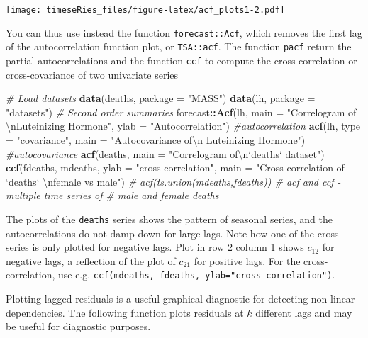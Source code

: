 \documentclass[]{book}
\newenvironment{Shaded}{\begin{snugshade}}{\end{snugshade}}
\newcommand{\CharTok}[1]{\textcolor[rgb]{0.31,0.60,0.02}{#1}}
\newcommand{\CommentTok}[1]{\textcolor[rgb]{0.56,0.35,0.01}{\textit{#1}}}
\newcommand{\DataTypeTok}[1]{\textcolor[rgb]{0.13,0.29,0.53}{#1}}
\newcommand{\KeywordTok}[1]{\textcolor[rgb]{0.13,0.29,0.53}{\textbf{#1}}}
\newcommand{\NormalTok}[1]{#1}
\newcommand{\OperatorTok}[1]{\textcolor[rgb]{0.81,0.36,0.00}{\textbf{#1}}}
\newcommand{\StringTok}[1]{\textcolor[rgb]{0.31,0.60,0.02}{#1}}
\begin{document}
\texttt{[image: timeseRies\_files/figure-latex/acf\_plots1-2.pdf]}

You can thus use instead the function \texttt{forecast::Acf}, which
removes the first lag of the autocorrelation function plot, or
\texttt{TSA::acf}. The function \texttt{pacf} return the partial
autocorrelations and the function \texttt{ccf} to compute the
cross-correlation or cross-covariance of two univariate series

\begin{Shaded}
\begin{Highlighting}[]
\CommentTok{# Load datasets}
\KeywordTok{data}\NormalTok{(deaths, }\DataTypeTok{package =} \StringTok{"MASS"}\NormalTok{)}
\KeywordTok{data}\NormalTok{(lh, }\DataTypeTok{package =} \StringTok{"datasets"}\NormalTok{)}
\CommentTok{# Second order summaries}
\NormalTok{forecast}\OperatorTok{::}\KeywordTok{Acf}\NormalTok{(lh, }\DataTypeTok{main =} \StringTok{"Correlogram of }\CharTok{\textbackslash{}n}\StringTok{Luteinizing Hormone"}\NormalTok{, }\DataTypeTok{ylab =} \StringTok{"Autocorrelation"}\NormalTok{)  }\CommentTok{#autocorrelation}
\KeywordTok{acf}\NormalTok{(lh, }\DataTypeTok{type =} \StringTok{"covariance"}\NormalTok{, }\DataTypeTok{main =} \StringTok{"Autocovariance of}\CharTok{\textbackslash{}n}\StringTok{ Luteinizing Hormone"}\NormalTok{)  }\CommentTok{#autocovariance}
\KeywordTok{acf}\NormalTok{(deaths, }\DataTypeTok{main =} \StringTok{"Correlogram of}\CharTok{\textbackslash{}n}\StringTok{`deaths` dataset"}\NormalTok{)}
\KeywordTok{ccf}\NormalTok{(fdeaths, mdeaths, }\DataTypeTok{ylab =} \StringTok{"cross-correlation"}\NormalTok{, }\DataTypeTok{main =} \StringTok{"Cross correlation of `deaths` }\CharTok{\textbackslash{}n}\StringTok{female vs male"}\NormalTok{)}
\CommentTok{# acf(ts.union(mdeaths,fdeaths)) # acf and ccf - multiple time series of}
\CommentTok{# male and female deaths}
\end{Highlighting}
\end{Shaded}

The plots of the \texttt{deaths} series shows the pattern of seasonal
series, and the autocorrelations do not damp down for large lags. Note
how one of the cross series is only plotted for negative lags. Plot in
row 2 column 1 shows \(c_{12}\) for negative lags, a reflection of the
plot of \(c_{21}\) for positive lags. For the cross-correlation, use
e.g. \texttt{ccf(mdeaths,\ fdeaths,\ ylab="cross-correlation")}.

Plotting lagged residuals is a useful graphical diagnostic for detecting
non-linear dependencies. The following function plots residuals at \(k\)
different lags and may be useful for diagnostic purposes.
\end{document}
